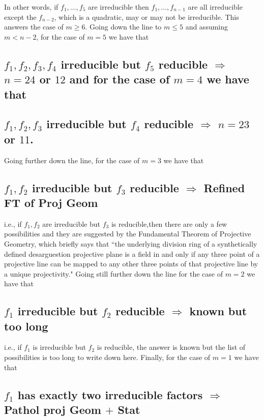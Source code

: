 In other words, if $f_{1}, \ldots, f_{5}$ are irreducible then $f_{1}, \ldots, f_{n-1}$ are all irreducible except the $f_{n-2}$, which is a quadratic, may or may not be irreducible. This answers the case of $m \geq 6$. Going down the line  to $m \leq 5$ and assuming $m<n-2$, for the case of $m=5$ we have that

\subsection{$f_{1}, f_{2}, f_{3}, f_{4}$ irreducible but $f_{5}$ reducible $\Rightarrow$ $n=24$ or $12$ and for the case of $m=4$ we have that}\label{art1-sec2.2}

\subsection{$f_{1}, f_{2}, f_{3}$ irreducible but $f_{4}$ reducible $\Rightarrow$ $n=23$ or $11$.}\label{art1-sec2.3}

Going further down the line, for the case of $m=3$ we have that

\subsection{$f_{1}, f_{2}$ irreducible but $f_{3}$ reducible $\Rightarrow$ Refined FT of Proj Geom}\label{art1-sec2.4}

i.e., if $f_{1}, f_{2}$ are irreducible but $f_{3}$ is reducible,then there are only a few possibilities and they are suggested by the Fundamental Theorem  of  Projective Geometry, which briefly says that ``the underlying division ring of a synthetically defined desarguestion projective plane is a field in and only if any three point of a projective line can be mapped to any other three points of that projective line by a unique projectivity." Going still further down the line for the case of $m=2$ we have that   

\subsection{$f_{1}$ irreducible but $f_{2}$ reducible $\Rightarrow$ known but too long}\label{art1-sec2.5}

i.e., if $f_{1}$ is irreducible but $f_{2}$ is reducible, the answer is known but the list of possibilities is too long to write down here. Finally, for the case of $m=1$ we have that

\subsection{$f_{1}$ has exactly two irreducible factors $\Rightarrow$ Pathol proj Geom $+$ Stat}\label{art1-sec2.6}

